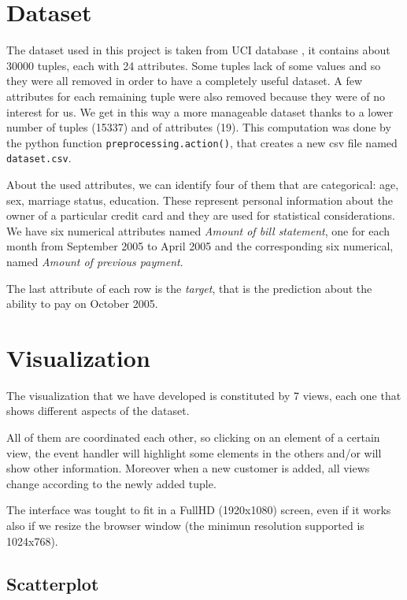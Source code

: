 \documentclass[journal]{vgtc}                %
\begin{document}
\section{Dataset}
The dataset used in this project is taken from UCI database \cite{UCI:2016} , it contains about 30000 tuples, each with 24 attributes.
Some tuples lack of some values and so they were all removed in order to have a completely useful dataset. A few attributes for each remaining tuple were also removed because they were of no interest for us. We get in this way a more manageable dataset thanks to a lower number of tuples (15337) and of attributes (19).
This computation was done by the python function \texttt{preprocessing.action()}, that creates a new csv file named \texttt{dataset.csv}.

About the used attributes, we can identify four of them that are categorical: age, sex, marriage status, education. These represent personal information about the owner of a particular credit card and they are used for statistical considerations. We have six numerical attributes named \textit{Amount of bill statement}, one for each month from September 2005 to April 2005 and the corresponding six numerical, named \textit{Amount of previous payment}.

The last attribute of each row is the \textit{target}, that is the prediction about the ability to pay on October 2005.


\section{Visualization}
The visualization that we have developed is constituted by 7 views,
each one that shows different aspects of the dataset.

All of them are coordinated each other, so clicking on an element of a
certain view, the event handler will highlight some elements in the
others and/or will show other information. Moreover when a new customer
is added, all views change according to the newly added tuple.

The interface was tought to fit in a FullHD (1920x1080) screen,
even if it works also if we resize the browser window (the minimun
resolution supported is 1024x768).


\subsection{Scatterplot}
\end{document}
